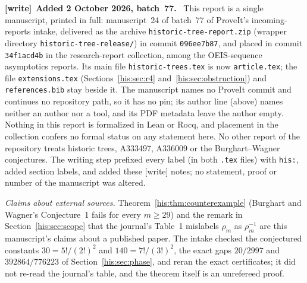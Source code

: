 \documentclass[11pt]{article}
\theoremstyle{remark}\newtheorem{remark}[theorem]{Remark}
\numberwithin{equation}{section}
\newenvironment{writenote}[1][]{\par\smallskip\begingroup\small
 \noindent\textbf{[write]}\if\relax\detokenize{#1}\relax\else~\textbf{#1.}\fi\ }%
 {\par\endgroup\smallskip}
\begin{document}
\begin{writenote}[Added 2 October 2026, batch~77]
This report is a single manuscript, printed in full: manuscript~24 of
batch~77 of ProveIt's incoming-reports intake, delivered as the archive
\texttt{historic-\allowbreak tree-\allowbreak report.zip} (wrapper directory
\texttt{historic-\allowbreak tree-\allowbreak release/}) in commit
\texttt{096ee7b87}, and placed in commit \texttt{34f1acd4b} in the
research-report collection, among the OEIS-sequence asymptotics reports. Its
main file \texttt{historic-trees.tex} is now \texttt{article.tex}; the
\verb|| file \texttt{extensions.tex} (Sections~\ref{his:sec:r4}
and~\ref{his:sec:obstruction}) and \texttt{references.bib} stay beside it. The
manuscript names no ProveIt commit and continues no repository path, so it has
no pin; its author line (above) names neither an author nor a tool, and its PDF
metadata leave the author empty. Nothing in this report is formalized in Lean or
Rocq, and placement in the collection confers no formal status on any
statement here. No other report of the repository treats historic trees,
A333497, A336009 or the Burghart--Wagner conjectures. The writing step prefixed
every label (in both \texttt{.tex} files) with \texttt{his:}, added section
labels, and added these \textsf{[write]} notes; no statement, proof or number of the manuscript was altered.

\emph{Claims about external sources.} Theorem~\ref{his:thm:counterexample}
(Burghart and Wagner's Conjecture~1 fails for every $m\ge29$) and the remark in
Section~\ref{his:sec:scope} that the journal's Table~1 mislabels $\rho_m$ as
$\rho_m^{-1}$ are this manuscript's claims about a published paper. The intake
checked the conjectured constants $30=5!/(2!)^2$ and $140=7!/(3!)^2$, the exact
gaps $20/2997$ and $392864/776223$ of Section~\ref{his:sec:phase}, and reran the
exact certificates; it did not re-read the journal's table, and the theorem
itself is an unrefereed proof.


\end{writenote}
\end{document}
